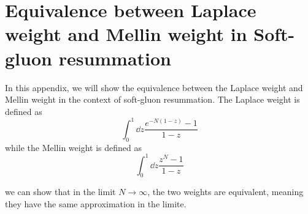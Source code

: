 \documentclass[../main.tex]{subfiles}
\begin{document}
\section{Equivalence between Laplace weight and Mellin weight in Soft-gluon resummation}
In this appendix, we will show the equivalence between the Laplace weight and Mellin weight in the context of soft-gluon resummation.
The Laplace weight is defined as
\begin{equation}
     \int_0^1 \dd{z} \frac{e^{- N (1-z)} - 1}{1-z}  
\end{equation}
while the Mellin weight is defined as
\begin{equation}
    \int_0^1 \dd{z} \frac{z^N - 1 }{1-z}
\end{equation}

we can show that in the limit $N \to \infty$, the two weights are equivalent, meaning they have the same
approximation in the limite.
\end{document}
